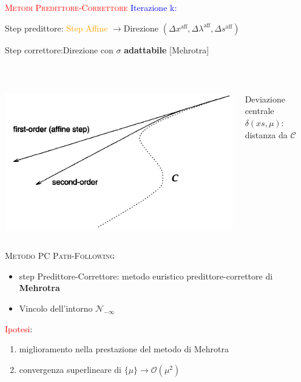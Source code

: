 \begin{frame}{\textsc{\LARGE \textcolor{red}{Metodi Predittore-Correttore}}}
\pause
\textcolor{blue}{Iterazione k:}
\pause
{}
\setcounter{elenco}{0}
\begin{list}{}{\setlength{\itemsep}{0.6cm}}
	\item Step predittore: \textcolor{orange}{Step Affine} $\rightarrow$\pause Direzione $(\Delta x^{\text{aff}}, \Delta \lambda^{\text{aff}},\Delta s^{\text{aff}})$
	\pause
	\item Step correttore:\pause \;\;Direzione con $\sigma$ \textbf{adattabile} [Mehrotra]
	\end{list}
\\[1 cm]
\pause
\begin{columns}
	\begin{column}{0.4\textwidth}
	\includegraphics[width=\columnwidth]{MEH.PNG}
\end{column}
\begin{column}{0.4\textwidth}
	Deviazione centrale $\delta(xs, \mu)$: distanza da $\mathcal{C}$
\end{column}
\end{columns}
\end{frame}


\begin{frame}[t]{\textsc{\LARGE \textcolor{sapphire}{Metodo PC Path-Following}}}
\begin{itemize}
\item step Predittore-Correttore: metodo euristico predittore-correttore di \textbf{Mehrotra}
\item Vincolo dell'intorno $\mathcal{N}_{-\infty}$
\end{itemize}
\pause
\textcolor{red}{Ipotesi}: 
\begin{enumerate}
	\item miglioramento nella prestazione del metodo di Mehrotra
	\item convergenza superlineare di $\{\mu\}\rightarrow \mathcal{O}(\mu^{2})$
\end{enumerate}
\end{frame}

